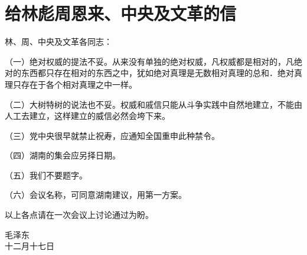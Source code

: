 \section[给林彪周恩来、中央及文革的信（一九六七年十二月十七日）]{给林彪周恩来、中央及文革的信}


林、周、中央及文革各同志：

（一）绝对权威的提法不妥。从来没有单独的绝对权威，凡权威都是相对的，凡绝对的东西都只存在相对的东西之中，犹如绝对真理是无数相对真理的总和．绝对真理只存在于各个相对真理之中一样。

（二）大树特树的说法也不妥。权威和戚信只能从斗争实践中自然地建立，不能由人工去建立，这样建立的威信必然会垮下来。

（三）党中央很早就禁止祝寿，应通知全国重申此种禁令。

（四）湖南的集会应另择日期。

（五）我们不要题字。

（六）会议名称，可同意湖南建议，用第一方案。

以上各点请在一次会议上讨论通过为盼。
{\raggedleft 毛泽东\\十二月十七日\par}


